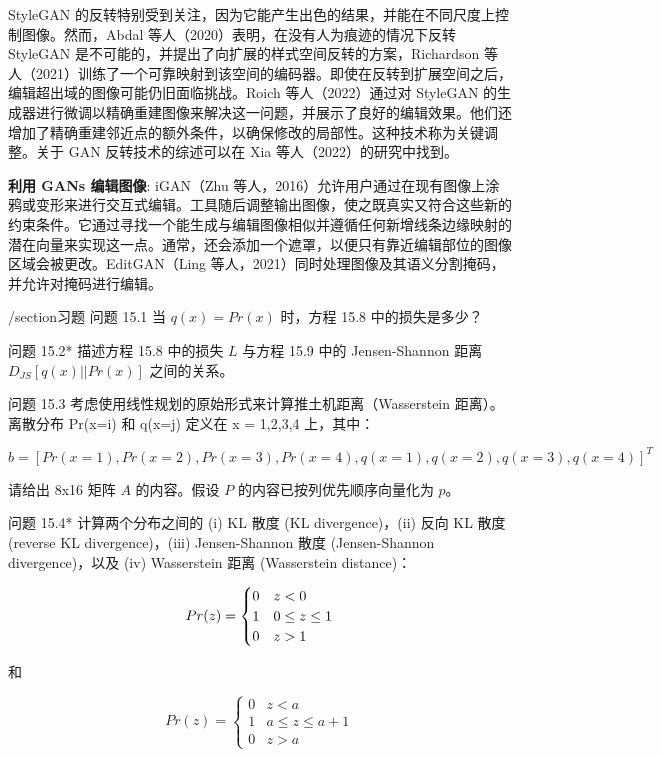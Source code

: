 \documentclass[lang=cn,newtx,10pt,scheme=chinese]{elegantbook}
\begin{document}
StyleGAN 的反转特别受到关注，因为它能产生出色的结果，并能在不同尺度上控制图像。然而，Abdal 等人（2020）表明，在没有人为痕迹的情况下反转 StyleGAN 是不可能的，并提出了向扩展的样式空间反转的方案，Richardson 等人（2021）训练了一个可靠映射到该空间的编码器。即使在反转到扩展空间之后，编辑超出域的图像可能仍旧面临挑战。Roich 等人（2022）通过对 StyleGAN 的生成器进行微调以精确重建图像来解决这一问题，并展示了良好的编辑效果。他们还增加了精确重建邻近点的额外条件，以确保修改的局部性。这种技术称为关键调整。关于 GAN 反转技术的综述可以在 Xia 等人（2022）的研究中找到。

\textbf{利用 GANs 编辑图像}: iGAN（Zhu 等人，2016）允许用户通过在现有图像上涂鸦或变形来进行交互式编辑。工具随后调整输出图像，使之既真实又符合这些新的约束条件。它通过寻找一个能生成与编辑图像相似并遵循任何新增线条边缘映射的潜在向量来实现这一点。通常，还会添加一个遮罩，以便只有靠近编辑部位的图像区域会被更改。EditGAN（Ling 等人，2021）同时处理图像及其语义分割掩码，并允许对掩码进行编辑。

/section{习题}
问题 15.1 当 \(q(x) = Pr(x)\) 时，方程 15.8 中的损失是多少？

问题 15.2* 描述方程 15.8 中的损失 \(L\) 与方程 15.9 中的 Jensen-Shannon 距离 \(D_{JS}[q(x) || Pr(x)]\) 之间的关系。

问题 15.3 考虑使用线性规划的原始形式来计算推土机距离（Wasserstein 距离）。离散分布 Pr(x=i) 和 q(x=j) 定义在 x = 1,2,3,4 上，其中：

\begin{equation}
b = [Pr(x=1), Pr(x=2), Pr(x=3), Pr(x=4), q(x=1), q(x=2), q(x=3), q(x=4)]^T 
\end{equation}

请给出 8x16 矩阵 \(A\) 的内容。假设 \(P\) 的内容已按列优先顺序向量化为 \(p\)。

问题 15.4* 计算两个分布之间的 (i) KL 散度 (KL divergence)，(ii) 反向 KL 散度 (reverse KL divergence)，(iii) Jensen-Shannon 散度 (Jensen-Shannon divergence)，以及 (iv) Wasserstein 距离 (Wasserstein distance)：

\begin{equation}
Pr(z) = \begin{cases}
0 & z < 0 \\
1 & 0 \leq z \leq 1 \\
0 & z > 1 \notag
\end{cases}
\end{equation}

和

\begin{equation}
Pr(z) = \begin{cases}
0 & z < a \\
1 & a \leq z \leq a + 1 \\
0 & z > a
\end{cases} 
\end{equation}
\end{document}
